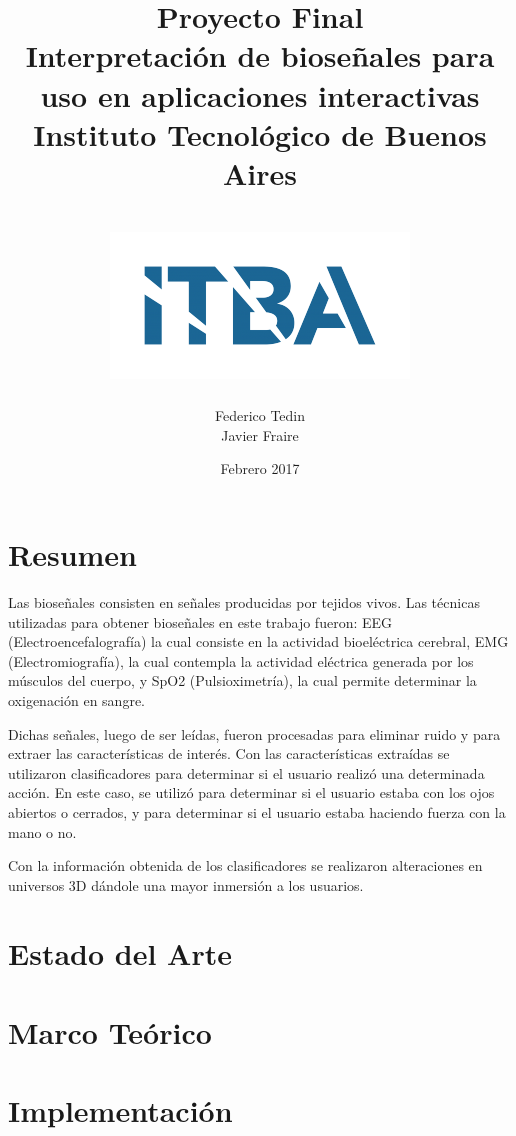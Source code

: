 \documentclass[a4paper]{report}
\title{
	{\Huge Proyecto Final}\\
	{\Huge Interpretación de bioseñales para uso en aplicaciones interactivas}
	{\large Instituto Tecnológico de Buenos Aires}\\~\\
	{\includegraphics{itba.png}}
}
\author{{Federico Tedin} \\ {Javier Fraire}}
\date{Febrero 2017}
\begin{document}
\maketitle

\chapter*{Resumen}
\justifying
Las bioseñales consisten en señales producidas por tejidos vivos. Las técnicas utilizadas para obtener bioseñales en este trabajo fueron: EEG (Electroencefalografía) la cual consiste en la actividad bioeléctrica cerebral, EMG (Electromiografía), la cual contempla la actividad eléctrica generada por los músculos del cuerpo, y SpO2 (Pulsioximetría), la cual permite determinar la oxigenación en sangre.

Dichas señales, luego de ser leídas, fueron procesadas para eliminar ruido y para extraer las características de interés. Con las características extraídas se utilizaron clasificadores para determinar si el usuario realizó una determinada acción. En este caso, se utilizó para determinar si el usuario estaba con los ojos abiertos o cerrados, y para determinar si el usuario estaba haciendo fuerza con la mano o no.

Con la información obtenida de los clasificadores se realizaron alteraciones en universos 3D dándole una mayor inmersión a los usuarios.


\tableofcontents

\chapter{Estado del Arte}


\chapter{Marco Teórico}


\chapter{Implementación}


{}

 
\end{document}
